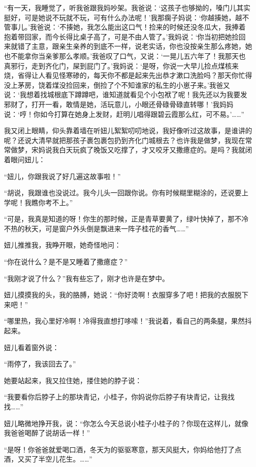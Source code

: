 \par “有一天，我睡觉了，听我爸跟我妈吵架。我爸说：‘这孩子也够拗的，嗓门儿其实挺好，可是她说不玩就不玩，可有什么办法呢！’我那瘸子妈说：‘你越揍她，越不管事儿。’我爸说：‘不揍她，我怎么能出这口气！捡来的时候还没冬瓜大，我捧着抱着带回家，而今长得比桌子高了，可是不由人管了。’我妈说：‘你当初把她捡回来就错了主意，跟亲生亲养的到底不一样，说老实话，你也没按亲生那么疼她，她也不能拿你当亲爹那么孝顺。’我爸叹了口气，又说：‘一晃儿五六年了！我那天也真邪行，走到齐化门，屎到屁门了。’我妈说：‘是呀，你说一大早儿捡点煤核来烧，省得让人看见怪寒碜的，每天你不都是起来先出恭才漱口洗脸吗？那天你忙得没上茅房，饶着煤没捡回来，倒捡了个不知谁家的私生的小崽子来。’我爸又说：‘我想着找城根底下蹲蹲吧，谁知道就看见个小包袱了呢！我先还以为我要发邪财了，打开一看，敢情是她，活玩意儿，小眼还骨碌骨碌直转哪！’我妈妈说：‘哼！你如今打算在她身上发财，赶明儿唱得跟碧云霞那么红，可不易。'……”
\par 我又闭上眼睛，仰头靠着墙在听妞儿絮絮叨叨地说，我好像听过这故事，是谁讲的呢？还说大清早就把那孩子裹包裹包扔到齐化门城根去？也许我是做梦，我现在常常做梦，宋妈说我白天玩疯了晚饭又吃撑了，才又咬牙又撒癔症的。是吗？我就闭着眼问妞儿：
\par “妞儿，你跟我说了好几遍这故事啦！”
\par “胡说，我跟谁也没说过。我今儿头一回跟你说。你有时候糊里糊涂的，还说要上学呢！我瞧你考不上。”
\par “可是，我真是知道的呀！你生的那时候，正是青草要黄了，绿叶快掉了，那不冷不热的秋天，可是窗户外头倒是飘进来一阵子桂花的香气……”
\par 妞儿推推我，我睁开眼，她奇怪地问：
\par “你在说什么？是不是又睡着了撒癔症？”
\par “我刚才说了什么？”我有些忘了，刚才也许是在梦中。
\par 妞儿摸摸我的头，我的胳膊，她说：“你好烫啊！衣服穿多了吧！把我的衣服脱下来吧！”
\par “哪里热，我心里好冷啊！冷得我直想打哆嗦！”我说着，看自己的两条腿，果然抖起来。
\par 妞儿看着窗外说：
\par “雨停了，我该回去了。”
\par 她要站起来，我又拉住她，搂住她的脖子说：
\par “我要看你后脖子上的那块青记，小桂子，你妈说你后脖子有块青记，让我找找……”
\par 妞儿略微地挣开我，说：“你怎么今天总说小桂子小桂子的？你现在这样儿，就像我爸爸喝醉了说胡话一样！”
\par “是呀！你爸爸就爱喝口酒，冬天为的驱驱寒意，那天风挺大，你妈给他打了点酒，又买了半空儿花生。……”
